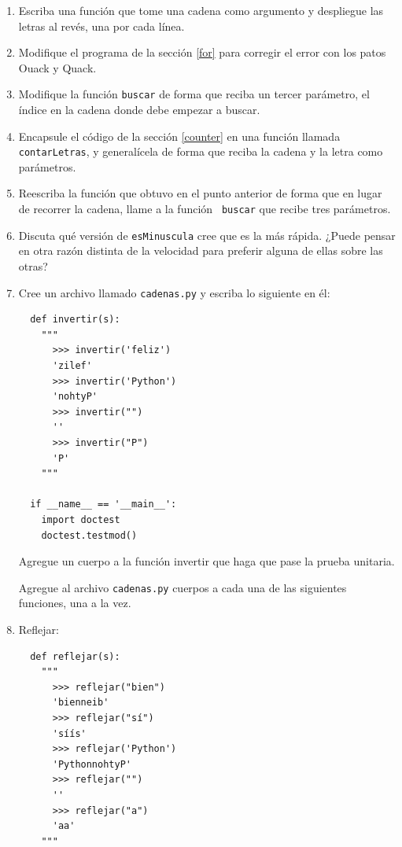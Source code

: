 \begin{enumerate}

 \item Escriba una función que tome una cadena como argumento
  y despliegue las letras al revés, una por cada línea.

 \item Modifique el programa de la sección \ref{for} para corregir el error
 con los patos Ouack y Quack.
 
 \item Modifique la función \texttt{buscar} de forma que reciba
  un tercer parámetro, el índice en la cadena donde debe empezar 
  a buscar.

  \item Encapsule el código de la sección \ref{counter} en una  función 
  llamada \texttt{contarLetras}, y  generalícela de forma que reciba
  la cadena y la letra como parámetros.

  \item  Reescriba la función que obtuvo en el punto anterior de forma que
  en lugar de recorrer la cadena, llame a la  función  {\tt
  buscar} que recibe tres parámetros.

  \item Discuta qué versión de \texttt{esMinuscula} cree
  que es la más rápida. ¿Puede pensar en otra razón distinta de la
   velocidad para preferir alguna de ellas sobre las otras?
   
  \item Cree un archivo llamado \verb+cadenas.py+ y escriba lo siguiente en él:
  
  \beforeverb
  \begin{verbatim}
  def invertir(s):
    """
      >>> invertir('feliz')
      'zilef'
      >>> invertir('Python')
      'nohtyP'
      >>> invertir("")
      ''
      >>> invertir("P")
      'P'
    """

  if __name__ == '__main__':
    import doctest
    doctest.testmod()
  \end{verbatim}
  \afterverb

  Agregue un cuerpo a la función invertir que haga que pase la prueba unitaria.
  
  Agregue al archivo \verb+cadenas.py+  cuerpos a cada una de las siguientes funciones, una a la vez.
  
  \item Reflejar:
  
  \beforeverb
  \begin{verbatim}
  def reflejar(s):
    """
      >>> reflejar("bien")
      'bienneib'
      >>> reflejar("sí")
      'síís'
      >>> reflejar('Python')
      'PythonnohtyP'
      >>> reflejar("")
      ''
      >>> reflejar("a")
      'aa'
    """
  \end{verbatim}
  \afterverb
  

\end{enumerate}
